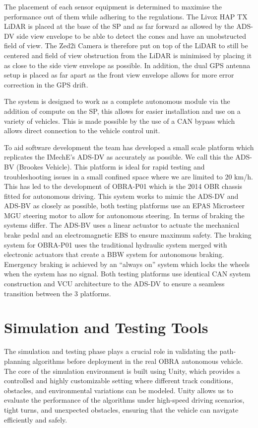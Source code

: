\documentclass[a4paper,11pt]{report}
\begin{document}
The placement of each sensor equipment is determined to maximise the performance out of them while adhering to the regulations. The Livox HAP TX LiDAR is placed at the base of the SP and as far forward as allowed by the ADS-DV side view envelope to be able to detect the cones and have an unobstructed field of view. The Zed2i Camera is therefore put on top of the LiDAR to still be centered and field of view obstruction from the LiDAR is minimised by placing it as close to the side view envelope as possible. In addition, the dual GPS antenna setup is placed as far apart as the front view envelope allows for more error correction in the GPS drift.

The system is designed to work as a complete autonomous module via the addition of compute on the SP, this allows for easier installation and use on a variety of vehicles. This is made possible by the use of a CAN bypass which allows direct connection to the vehicle control unit.

To aid software development the team has developed a small scale platform which replicates the IMechE’s ADS-DV as accurately as possible. We call this the ADS-BV (Brookes Vehicle). This platform is ideal for rapid testing and troubleshooting issues in a small confined space where we are limited to 20 km/h. This has led to the development of OBRA-P01 which is the 2014 OBR chassis fitted for autonomous driving. This system works to mimic the ADS-DV and ADS-BV as closely as possible, both testing platforms use an EPAS Microsteer MGU steering motor to allow for autonomous steering. In terms of braking the systems differ. The ADS-BV uses a linear actuator to actuate the mechanical brake pedal and an electromagnetic EBS to ensure maximum safety. The braking system for OBRA-P01 uses the traditional hydraulic system merged with electronic actuators that create a BBW system for autonomous braking. Emergency braking is achieved by an “always on” system which locks the wheels when the system has no signal. Both testing platforms use identical CAN system construction and VCU architecture to the ADS-DV to ensure a seamless transition between the 3 platforms.





\section{Simulation and Testing Tools}

The simulation and testing phase plays a crucial role in validating the path-planning algorithms before deployment in the real OBRA autonomous vehicle. The core of the simulation environment is built using Unity, which provides a controlled and highly customizable setting where different track conditions, obstacles, and environmental variations can be modeled. Unity allows us to evaluate the performance of the algorithms under high-speed driving scenarios, tight turns, and unexpected obstacles, ensuring that the vehicle can navigate efficiently and safely.
\end{document}
